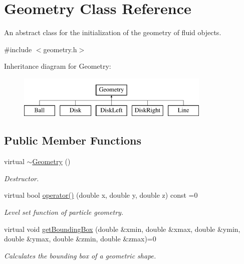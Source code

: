 \hypertarget{classGeometry}{\section{Geometry Class Reference}
\label{classGeometry}
}


An abstract class for the initialization of the geometry of fluid objects.  




{\ttfamily \#include $<$geometry.\-h$>$}

Inheritance diagram for Geometry\-:\begin{figure}[H]
\begin{center}
\leavevmode
\includegraphics[height=2.000000cm]{classGeometry}
\end{center}
\end{figure}
\subsection*{Public Member Functions}
\begin{DoxyCompactItemize}
\item 
\hypertarget{classGeometry_aedd2e92f79197c6f0671c5d14cf72578}{virtual \hyperlink{classGeometry_aedd2e92f79197c6f0671c5d14cf72578}{$\sim$\-Geometry} ()}\label{classGeometry_aedd2e92f79197c6f0671c5d14cf72578}

\begin{DoxyCompactList}\small\item\em Destructor. \end{DoxyCompactList}\item 
virtual bool \hyperlink{classGeometry_a69dbaf841341db31d0c412bcdbf50766}{operator()} (double x, double y, double z) const =0
\begin{DoxyCompactList}\small\item\em Level set function of particle geometry. \end{DoxyCompactList}\item 
virtual void \hyperlink{classGeometry_aa8c0f7ecf1cfb99c4f997399ffe3fdb7}{get\-Bounding\-Box} (double \&xmin, double \&xmax, double \&ymin, double \&ymax, double \&zmin, double \&zmax)=0
\begin{DoxyCompactList}\small\item\em Calculates the bounding box of a geometric shape. \end{DoxyCompactList}\end{DoxyCompactItemize}


